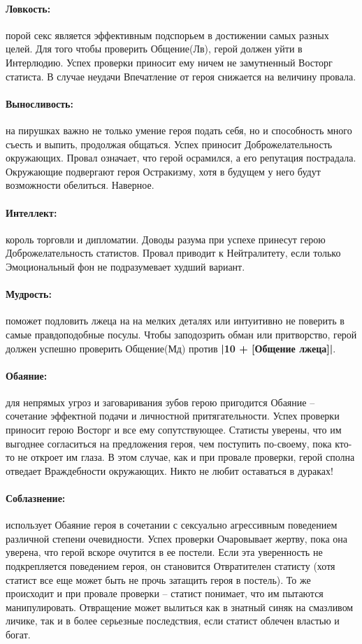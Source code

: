 \paragraph{Ловкость:} порой секс является эффективным подспорьем в достижении самых разных целей.
\newline Для того чтобы проверить Общение(Лв), герой должен уйти в Интерлюдию. Успех проверки приносит ему ничем не замутненный Восторг статиста. В случае неудачи Впечатление от героя снижается на величину провала.
\paragraph{Выносливость:} на пирушках важно не только умение героя подать себя, но и способность много съесть и выпить, продолжая общаться. Успех приносит Доброжелательность окружающих. Провал означает, что герой осрамился, а его репутация пострадала. Окружающие подвергают героя Остракизму, хотя в будущем у него будут возможности обелиться. Наверное.
\paragraph{Интеллект:} король торговли и дипломатии. Доводы разума при успехе принесут герою Доброжелательность статистов. Провал приводит к Нейтралитету, если только Эмоциональный фон не подразумевает худший вариант.
\paragraph{Мудрость:} поможет подловить лжеца на на мелких деталях или интуитивно не поверить в самые правдоподобные посулы. Чтобы заподозрить обман или притворство, герой должен успешно проверить Общение(Мд) против \textbf{|10 + [Общение лжеца]|}. 
\paragraph{Обаяние:} для непрямых угроз и заговаривания зубов герою пригодится Обаяние – сочетание эффектной подачи и личностной притягательности. 
\newline Успех проверки приносит герою Восторг и все ему сопутствующее. Статисты уверены, что им выгоднее согласиться на предложения героя, чем поступить по-своему, пока кто-то не откроет им глаза. В этом случае, как и при провале проверки, герой сполна отведает Враждебности окружающих. Никто не любит оставаться в дураках!
\paragraph{Соблазнение:} использует Обаяние героя в сочетании с сексуально агрессивным поведением различной степени очевидности. 
\newline Успех проверки Очаровывает жертву, пока она уверена, что герой вскоре очутится в ее постели. Если эта уверенность не подкрепляется поведением героя, он становится Отвратителен статисту (хотя статист все еще может быть не прочь затащить героя в постель). То же происходит и при провале проверки – статист понимает, что им пытаются манипулировать. Отвращение может вылиться как в знатный синяк на смазливом личике, так и в более серьезные последствия, если статист облечен властью и богат. 
